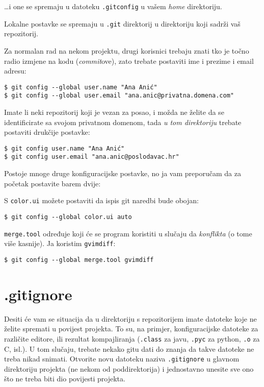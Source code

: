 \dots{}i one se spremaju u datoteku \verb+.gitconfig+ u vašem \emph{home} direktoriju.

Lokalne postavke se spremaju u \verb+.git+ direktorij u direktoriju koji sadrži vaš repozitorij.

Za normalan rad na nekom projektu, drugi korisnici trebaju znati tko je točno radio izmjene na kodu (\emph{commit}ove), zato trebate postaviti ime i prezime i email adresu:

\begin{verbatim}
$ git config --global user.name "Ana Anić"
$ git config --global user.email "ana.anic@privatna.domena.com"
\end{verbatim}

Imate li neki repozitorij koji je vezan za posao, i možda ne želite da se identificirate sa svojom privatnom domenom, tada \emph{u tom direktoriju} trebate postaviti drukčije postavke:

\begin{verbatim}
$ git config user.name "Ana Anić"
$ git config user.email "ana.anic@poslodavac.hr"
\end{verbatim}

Postoje mnoge druge konfiguracijske postavke, no ja vam preporučam da za početak postavite barem dvije:

S \verb+color.ui+ možete postaviti da ispis git naredbi bude obojan:

\begin{verbatim}
$ git config --global color.ui auto
\end{verbatim}

\verb+merge.tool+ određuje koji će se program koristiti u slučaju da \emph{konflikta} (o tome više kasnije). Ja koristim \verb+gvimdiff+:

\begin{verbatim}
$ git config --global merge.tool gvimdiff
\end{verbatim}

\section*{.gitignore}

Desiti će vam se situacija da u direktoriju s repozitorijem imate datoteke koje ne želite spremati u povijest projekta.
To su, na primjer, konfiguracijske datoteke za različite editore, ili rezultat kompajliranja (\verb+.class+ za javu, \verb+.pyc+ za python, \verb+.o+ za C, isl.).
U tom slučaju, trebate nekako gitu dati do znanja da takve datoteke ne treba nikad snimati.
Otvorite novu datoteku naziva \verb+.gitignore+ u glavnom direktoriju projekta (ne nekom od poddirektorija) i jednostavno unesite sve ono što ne treba biti dio povijesti projekta.

